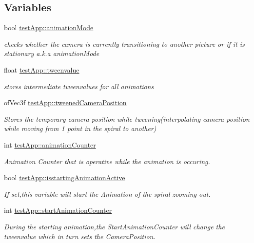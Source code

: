 \subsection*{Variables}
\begin{DoxyCompactItemize}
\item 
bool \hyperlink{group___camera_animation_ga2a5d49fd1f7f50f745f56095a1fa0099}{test\-App\-::animation\-Mode}
\begin{DoxyCompactList}\small\item\em checks whether the camera is currently transitioning to another picture or if it is stationary a.\-k.\-a animation\-Mode \end{DoxyCompactList}\item 
float \hyperlink{group___camera_animation_gadd9ab1aa902948afbdf1c6db0dfde385}{test\-App\-::tweenvalue}
\begin{DoxyCompactList}\small\item\em stores intermediate tweenvalues for all animations \end{DoxyCompactList}\item 
of\-Vec3f \hyperlink{group___camera_animation_gae9f60797c1c5d9f1ac06e1d6a5259957}{test\-App\-::tweened\-Camera\-Position}
\begin{DoxyCompactList}\small\item\em Stores the temporary camera position while tweening(interpolating camera position while moving from 1 point in the spiral to another) \end{DoxyCompactList}\item 
int \hyperlink{group___camera_animation_ga21b16bdba744425519597fcb925df43a}{test\-App\-::animation\-Counter}
\begin{DoxyCompactList}\small\item\em Animation Counter that is operative while the animation is occuring. \end{DoxyCompactList}\item 
bool \hyperlink{group___camera_animation_gab8a277e1055730fb5d6786ce0c4804b2}{test\-App\-::isstarting\-Animation\-Active}
\begin{DoxyCompactList}\small\item\em If set,this variable will start the Animation of the spiral zooming out. \end{DoxyCompactList}\item 
int \hyperlink{group___camera_animation_ga577bf117cf10109de967ea0d3ca17f1f}{test\-App\-::start\-Animation\-Counter}
\begin{DoxyCompactList}\small\item\em During the starting animation,the Start\-Animation\-Counter will change the tweenvalue which in turn sets the Camera\-Position. \end{DoxyCompactList}\end{DoxyCompactItemize}


